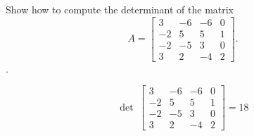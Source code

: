 
\begin{exerciseStatement}


Show how to compute the determinant of the matrix \[A= \left[\begin{array}{cccc}
3 & -6 & -6 & 0 \\
-2 & 5 & 5 & 1 \\
-2 & -5 & 3 & 0 \\
3 & 2 & -4 & 2
\end{array}\right] .\].


\end{exerciseStatement}
    
\begin{exerciseAnswer} 
\[\operatorname{det}\  \left[\begin{array}{cccc}
3 & -6 & -6 & 0 \\
-2 & 5 & 5 & 1 \\
-2 & -5 & 3 & 0 \\
3 & 2 & -4 & 2
\end{array}\right] = 18 \]
\end{exerciseAnswer}
    
